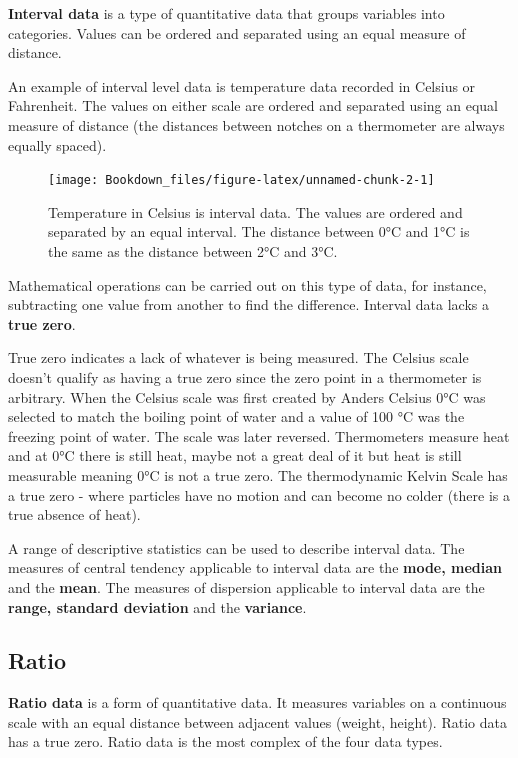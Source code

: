 \documentclass[
]{book}
\begin{document}
\textbf{Interval data} is a type of quantitative data that groups variables into categories. Values can be ordered and separated using an equal measure of distance.

An example of interval level data is temperature data recorded in Celsius or Fahrenheit. The values on either scale are ordered and separated using an equal measure of distance (the distances between notches on a thermometer are always equally spaced).

\begin{figure}

{\centering \texttt{[image: Bookdown\_files/figure-latex/unnamed-chunk-2-1]} 

}

\caption{Temperature in Celsius is interval data. The values are ordered and separated by an equal interval. The distance between 0°C and 1°C is the same as the distance between 2°C and 3°C.}\label{fig:unnamed-chunk-2}
\end{figure}

Mathematical operations can be carried out on this type of data, for instance, subtracting one value from another to find the difference. Interval data lacks a \textbf{true zero}.

True zero indicates a lack of whatever is being measured. The Celsius scale doesn't qualify as having a true zero since the zero point in a thermometer is arbitrary. When the Celsius scale was first created by Anders Celsius 0°C was selected to match the boiling point of water and a value of 100 °C was the freezing point of water. The scale was later reversed. Thermometers measure heat and at 0°C there is still heat, maybe not a great deal of it but heat is still measurable meaning 0°C is not a true zero. The thermodynamic Kelvin Scale has a true zero - where particles have no motion and can become no colder (there is a true absence of heat).

A range of descriptive statistics can be used to describe interval data. The measures of central tendency applicable to interval data are the \textbf{mode, median} and the \textbf{mean}. The measures of dispersion applicable to interval data are the \textbf{range, standard deviation} and the \textbf{variance}.

\hypertarget{ratio}{%
\subsection{Ratio}\label{ratio}}

\textbf{Ratio data} is a form of quantitative data. It measures variables on a continuous scale with an equal distance between adjacent values (weight, height). Ratio data has a true zero. Ratio data is the most complex of the four data types.
\end{document}
